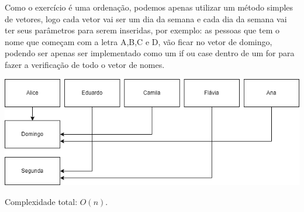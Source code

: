 Como o exercício é uma ordenação, podemos apenas utilizar um método simples de
vetores, logo cada vetor vai ser um dia da semana e cada dia da semana vai ter
seus parâmetros para serem inseridas, por exemplo: as pessoas que tem o nome
que começam com a letra A,B,C e D, vão ficar no vetor de domingo, podendo ser
apenas ser implementado como um if ou case dentro de um for para fazer a
verificação de todo o vetor de nomes.

\begin{center}
    \includegraphics[scale=0.5]{lista/lista-ed.png}
\end{center}

Complexidade total: $O(n)$.
